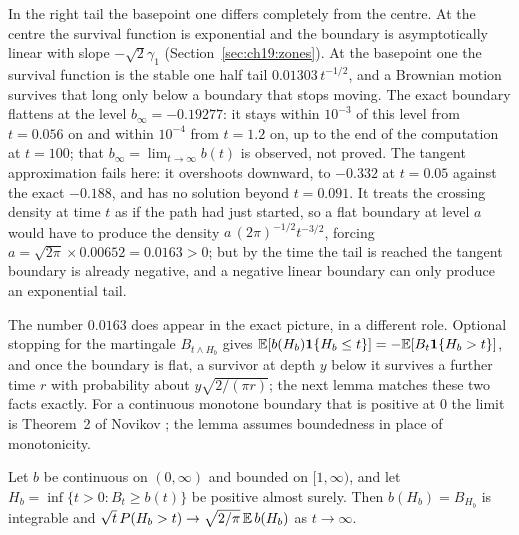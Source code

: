 In the right tail the basepoint one differs completely from the centre. At the centre the survival function is exponential and the boundary is asymptotically linear with slope $-\sqrt2\gamma_1$ (Section~\ref{sec:ch19:zones}). At the basepoint one the survival function is the stable one half tail $0.01303\,t^{-1/2}$, and a Brownian motion survives that long only below a boundary that stops moving. The exact boundary flattens at the level $b_\infty=-0.19277$: it stays within $10^{-3}$ of this level from $t=0.056$ on and within $10^{-4}$ from $t=1.2$ on, up to the end of the computation at $t=100$; that $b_\infty=\lim_{t\to\infty}b(t)$ is observed, not proved. The tangent approximation fails here: it overshoots downward, to $-0.332$ at $t=0.05$ against the exact $-0.188$, and has no solution beyond $t=0.091$. It treats the crossing density at time $t$ as if the path had just started, so a flat boundary at level $a$ would have to produce the density $a\,(2\pi)^{-1/2}t^{-3/2}$, forcing $a=\sqrt{2\pi}\times0.00652=0.0163>0$; but by the time the tail is reached the tangent boundary is already negative, and a negative linear boundary can only produce an exponential tail.

The number $0.0163$ does appear in the exact picture, in a different role. Optional stopping for the martingale $B_{t\wedge H_b}$ gives $\mathbb{E}[b(H_b)\mathbf 1\{H_b\le t\}]=-\mathbb{E}[B_t\mathbf 1\{H_b>t\}]$, and once the boundary is flat, a survivor at depth $y$ below it survives a further time $r$ with probability about $y\sqrt{2/(\pi r)}$; the next lemma matches these two facts exactly. For a continuous monotone boundary that is positive at $0$ the limit is Theorem~2 of Novikov \cite{Novikov96}; the lemma assumes boundedness in place of monotonicity.

\begin{lemma}\label{bp:lem:wald}
Let $b$ be continuous on $(0,\infty)$ and bounded on $[1,\infty)$, and let $H_b=\inf\{t>0:B_t\ge b(t)\}$ be positive almost surely. Then $b(H_b)=B_{H_b}$ is integrable and $\sqrt t\,P(H_b>t)\to\sqrt{2/\pi}\,\mathbb{E}\,b(H_b)$ as $t\to\infty$.
\end{lemma}

